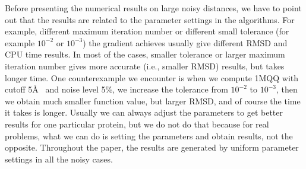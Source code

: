 \documentclass[a4paper,12pt]{article}
\begin{document}
Before presenting the numerical results on large noisy distances, we have to point out that the results are related to the parameter settings in the algorithms. For example, different maximum iteration number or different small tolerance (for example $10^{-2}$ or $10^{-3}$) the gradient achieves usually give different RMSD and CPU time results. In most of the cases, smaller tolerance or larger maximum iteration number gives more accurate (i.e., smaller RMSD) results, but takes longer time. One counterexample we encounter is when we compute 1MQQ with cutoff 5\AA~ and noise level 5\%, we increase the tolerance from $10^{-2}$ to $10^{-3}$, then we obtain much smaller function value, but larger RMSD, and of course the time it takes is longer. Usually we can always adjust the parameters to get better results for one particular protein, but we do not do that because for real problems, what we can do is setting the parameters and obtain results, not the opposite. Throughout the paper, the results are generated by uniform parameter settings in all the noisy cases.
\end{document}
